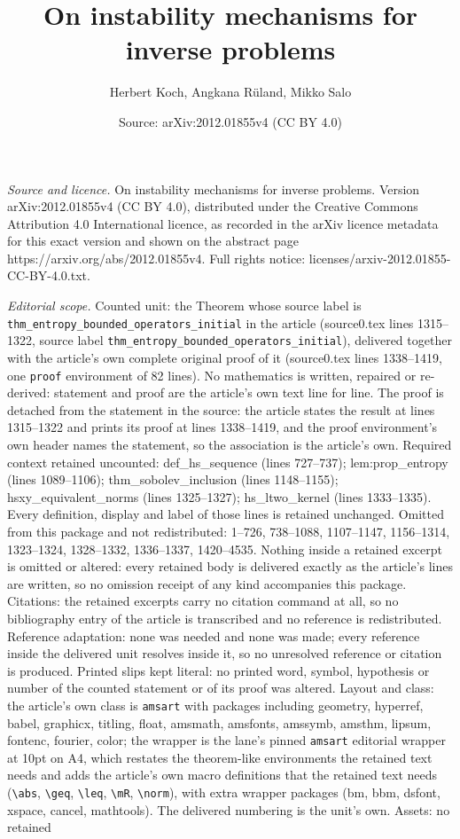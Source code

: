 \documentclass[10pt,a4paper]{amsart}
\title[On instability mechanisms for inverse problems]{On instability mechanisms for inverse problems}
\author{Herbert Koch, Angkana R\"uland, Mikko Salo}
\date{Source: arXiv:2012.01855v4 (CC BY 4.0)}
\begin{document}
\maketitle

\noindent\emph{Source and licence.} On instability mechanisms for inverse problems. Version arXiv:2012.01855v4 (CC BY 4.0), distributed under the Creative Commons Attribution 4.0 International licence, as recorded in the arXiv licence metadata for this exact version and shown on the abstract page https://arxiv.org/abs/2012.01855v4. Full rights notice: licenses/arxiv-2012.01855-CC-BY-4.0.txt.\par\smallskip

\noindent\textit{Editorial scope.} Counted unit: the Theorem whose source label is \texttt{thm\_entropy\_bounded\_operators\_initial} in the article (source0.tex lines 1315--1322, source label \texttt{thm\_entropy\_bounded\_operators\_initial}), delivered together with the article's own complete original proof of it (source0.tex lines 1338--1419, one \texttt{proof} environment of 82 lines). No mathematics is written, repaired or re-derived: statement and proof are the article's own text line for line. The proof is detached from the statement in the source: the article states the result at lines 1315--1322 and prints its proof at lines 1338--1419, and the proof environment's own header names the statement, so the association is the article's own. Required context retained uncounted: def\_hs\_sequence (lines 727--737); lem:prop\_entropy (lines 1089--1106); thm\_sobolev\_inclusion (lines 1148--1155); hsxy\_equivalent\_norms (lines 1325--1327); hs\_ltwo\_kernel (lines 1333--1335). Every definition, display and label of those lines is retained unchanged. Omitted from this package and not redistributed: 1--726, 738--1088, 1107--1147, 1156--1314, 1323--1324, 1328--1332, 1336--1337, 1420--4535. Nothing inside a retained excerpt is omitted or altered: every retained body is delivered exactly as the article's lines are written, so no omission receipt of any kind accompanies this package. Citations: the retained excerpts carry no citation command at all, so no bibliography entry of the article is transcribed and no reference is redistributed. Reference adaptation: none was needed and none was made; every reference inside the delivered unit resolves inside it, so no unresolved reference or citation is produced. Printed slips kept literal: no printed word, symbol, hypothesis or number of the counted statement or of its proof was altered. Layout and class: the article's own class is \texttt{amsart} with packages including geometry, hyperref, babel, graphicx, titling, float, amsmath, amsfonts, amssymb, amsthm, lipsum, fontenc, fourier, color; the wrapper is the lane's pinned \texttt{amsart} editorial wrapper at 10pt on A4, which restates the theorem-like environments the retained text needs and adds the article's own macro definitions that the retained text needs (\texttt{\textbackslash abs}, \texttt{\textbackslash geq}, \texttt{\textbackslash leq}, \texttt{\textbackslash mR}, \texttt{\textbackslash norm}), with extra wrapper packages (bm, bbm, dsfont, xspace, cancel, mathtools). The delivered numbering is the unit's own. Assets: no retained 
\end{document}
